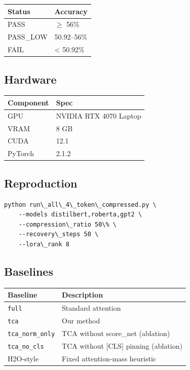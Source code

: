 \begin{table}[H]
\centering
\small
\begin{tabular}{ll}
\toprule
\textbf{Status} & \textbf{Accuracy} \\
\midrule
PASS & $\ge$ 56\% \\
PASS\_LOW & 50.92--56\% \\
FAIL & \textless{} 50.92\% \\
\bottomrule
\end{tabular}
\end{table}

\subsection{Hardware}

\begin{table}[H]
\centering
\small
\begin{tabular}{ll}
\toprule
\textbf{Component} & \textbf{Spec} \\
\midrule
GPU & NVIDIA RTX 4070 Laptop \\
VRAM & 8 GB \\
CUDA & 12.1 \\
PyTorch & 2.1.2 \\
\bottomrule
\end{tabular}
\end{table}

\subsection{Reproduction}

\begin{lstlisting}
python run\_all\_4\_token\_compressed.py \
    --models distilbert,roberta,gpt2 \
    --compression\_ratio 50\% \
    --recovery\_steps 50 \
    --lora\_rank 8
\end{lstlisting}

\subsection{Baselines}

\begin{table}[H]
\centering
\small
\begin{tabular}{ll}
\toprule
\textbf{Baseline} & \textbf{Description} \\
\midrule
\texttt{full} & Standard attention \\
\texttt{tca} & Our method \\
\texttt{tca\_norm\_only} & TCA without score\_net (ablation) \\
\texttt{tca\_no\_cls} & TCA without [CLS] pinning (ablation) \\
H2O-style & Fixed attention-mass heuristic \\
\bottomrule
\end{tabular}
\end{table}

